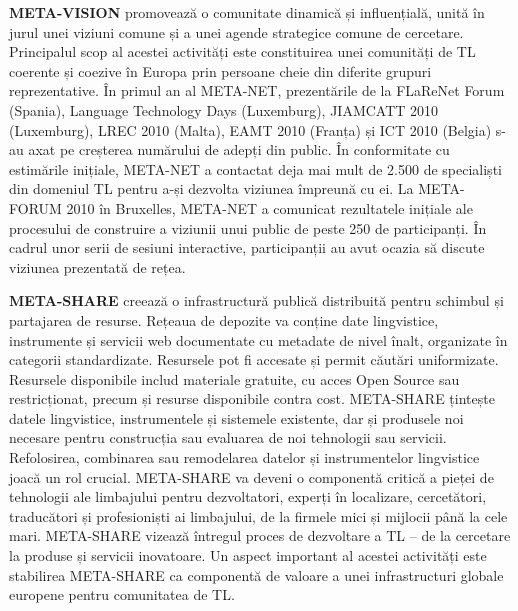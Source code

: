 \documentclass[]{../../metanetpaper}
\begin{document}
\begin{multicols}{2}
\textbf{META-VISION} promovează o comunitate dinamică și influențială, unită în jurul unei viziuni comune și a unei agende strategice comune de cercetare. Principalul scop al acestei activități este constituirea unei comunități de TL coerente și coezive în Europa prin persoane cheie din diferite grupuri reprezentative. În primul an al META-NET, prezentările de la FLaReNet Forum (Spania), Language Technology Days (Luxemburg), JIAMCATT 2010 (Luxemburg), LREC 2010 (Malta), EAMT 2010 (Franța) și ICT 2010 (Belgia) s-au axat pe creșterea numărului de adepți din public. În conformitate cu estimările inițiale, META-NET a contactat deja mai mult de 2.500 de specialiști din domeniul TL pentru a-și dezvolta viziunea împreună cu ei. La META-FORUM 2010 în Bruxelles, META-NET a comunicat rezultatele inițiale ale procesului de construire a viziunii unui public de peste 250 de participanți. În cadrul unor serii de sesiuni interactive, participanții au avut ocazia să discute viziunea prezentată de rețea. 

\textbf{META-SHARE} creează o infrastructură publică distribuită pentru schimbul și partajarea de resurse. Rețeaua de depozite va conține date lingvistice, instrumente și servicii web documentate cu metadate de nivel înalt, organizate în categorii standardizate. Resursele pot fi accesate și permit căutări uniformizate. Resursele disponibile includ materiale gratuite, cu acces Open Source sau restricționat, precum și resurse disponibile contra cost. META-SHARE țintește datele lingvistice, instrumentele și sistemele existente, dar și produsele noi necesare pentru construcția sau evaluarea de noi tehnologii sau servicii. Refolosirea, combinarea sau remodelarea datelor și instrumentelor lingvistice joacă un rol crucial. META-SHARE va deveni o componentă critică a pieței de tehnologii ale limbajului pentru dezvoltatori, experți în localizare, cercetători, traducători și profesioniști ai limbajului, de la firmele mici și mijlocii până la cele mari. META-SHARE vizează întregul proces de dezvoltare a TL – de la cercetare la produse și servicii inovatoare. Un aspect important al acestei activități este stabilirea META-SHARE ca componentă de valoare a unei infrastructuri globale europene pentru comunitatea de TL. 


\end{multicols}
\end{document}
